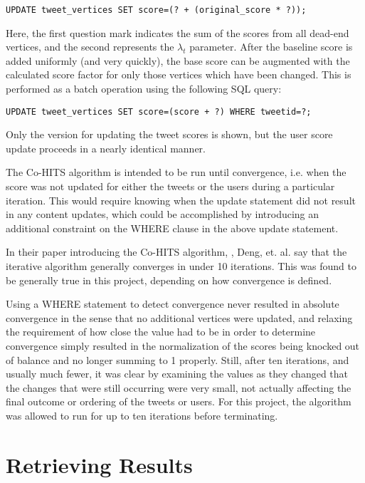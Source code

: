 \begin{verbatim}
UPDATE tweet_vertices SET score=(? + (original_score * ?));
\end{verbatim}

\noindent
Here, the first question mark indicates the sum of the scores from all dead-end vertices, and the second represents the $\lambda_{t}$ parameter. After the baseline score is added uniformly (and very quickly), the base score can be augmented with the calculated score factor for only those vertices which have been changed. This is performed as a batch operation using the following SQL query:

\begin{verbatim}
UPDATE tweet_vertices SET score=(score + ?) WHERE tweetid=?;
\end{verbatim}

\noindent
Only the version for updating the tweet scores is shown, but the user score update proceeds in a nearly identical manner.

The Co-HITS algorithm is intended to be run until convergence, i.e. when the score was not updated for either the tweets or the users during a particular iteration. This would require knowing when the update statement did not result in any content updates, which could be accomplished by introducing an additional constraint on the WHERE clause in the above update statement.

In their paper introducing the Co-HITS algorithm, \cite{Deng2009}, Deng, et. al. say that the iterative algorithm generally converges in under 10 iterations. This was found to be generally true in this project, depending on how convergence is defined. 

Using a WHERE statement to detect convergence never resulted in absolute convergence in the sense that no additional vertices were updated, and relaxing the requirement of how close the value had to be in order to determine convergence simply resulted in the normalization of the scores being knocked out of balance and no longer summing to 1 properly. Still, after ten iterations, and usually much fewer, it was clear by examining the values as they changed that the changes that were still occurring were very small, not actually affecting the final outcome or ordering of the tweets or users. For this project, the algorithm was allowed to run for up to ten iterations before terminating.


\section{Retrieving Results}
\label{sec:RetrievingResults}

